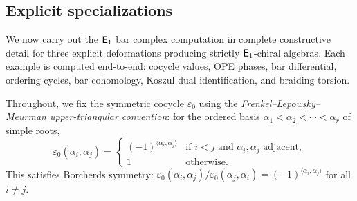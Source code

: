 \subsection{Explicit specializations}
\label{sec:lattice:explicit-e1}

We now carry out the $\mathsf{E}_1$ bar complex computation in complete
constructive detail for three explicit deformations producing strictly
$\mathsf{E}_1$-chiral algebras.  Each example is computed end-to-end: cocycle
values, OPE phases, bar differential, ordering cycles, bar cohomology,
Koszul dual identification, and braiding torsion.

Throughout, we fix the symmetric cocycle $\varepsilon_0$ using the
\emph{Frenkel--Lepowsky--Meurman upper-triangular convention}: for
the ordered basis $\alpha_1 < \alpha_2 < \cdots < \alpha_r$ of
simple roots,
\begin{equation}\label{eq:lattice:flm-cocycle}
\varepsilon_0(\alpha_i, \alpha_j)
=
\begin{cases}
(-1)^{\langle\alpha_i,\alpha_j\rangle} & \text{if } i < j
  \text{ and $\alpha_i, \alpha_j$ adjacent}, \\
1 & \text{otherwise}.
\end{cases}
\end{equation}
This satisfies Borcherds symmetry:
$\varepsilon_0(\alpha_i,\alpha_j)/\varepsilon_0(\alpha_j,\alpha_i)
= (-1)^{\langle\alpha_i,\alpha_j\rangle}$ for all $i \neq j$.


